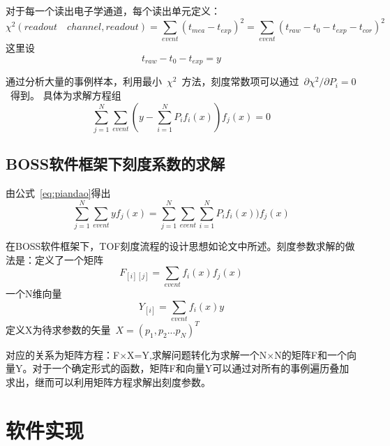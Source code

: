 对于每一个读出电子学通道，每个读出单元定义：
\begin{equation}
\chi^2(readout\quad channel,readout)=\sum\limits_{event}(t_{mea}-t_{exp})^2=\sum\limits_{event}(t_{raw}-t_{0}-t_{exp}-t_{cor})^2
\end{equation}
这里设
\begin{equation}
t_{raw}-t_{0}-t_{exp}=y
\end{equation}

通过分析大量的事例样本，利用最小~$\chi^2$~方法，刻度常数项可以通过~$\partial\chi^2/\partial P_{i}=0$~得到。
具体为求解方程组
\begin{equation}
\sum\limits_{j=1}^{N}\sum\limits_{event}(y-\sum\limits_{i=1}^{N} P_{i}f_{i}(x))f_{j}(x)=0
\label{eq:piandao}
\end{equation}
\subsection{BOSS软件框架下刻度系数的求解}
由公式~\ref{eq:piandao}得出
\begin{equation}
\sum\limits_{j=1}^{N}\sum\limits_{event}yf_{j}(x)=\sum\limits_{j=1}^{N}\sum\limits_{event}\sum\limits_{i=1}^{N} P_{i}f_{i}(x))f_{j}(x)
\label{eq:piandao}
\end{equation}

在BOSS软件框架下，TOF刻度流程的设计思想如论文\cite{2007hjf}中所述。刻度参数求解的做法是：定义了一个矩阵
\begin{equation}
F_{[i][j]}=\sum\limits_{event}f_{i}(x)f_{j}(x)
\end{equation}
一个N维向量
\begin{equation}
Y_{[i]}=\sum\limits_{event}f_{i}(x)y
\end{equation}
定义X为待求参数的矢量~$X=(p_{1},p_{2}...p_{N})^{T}$

对应的关系为矩阵方程：F$\times$X=Y,求解问题转化为求解一个N$\times$N的矩阵F和一个向量Y。对于一个确定形式的函数，矩阵F和向量Y可以通过对所有的事例遍历叠加求出，继而可以利用矩阵方程求解出刻度参数。

\section{软件实现}
